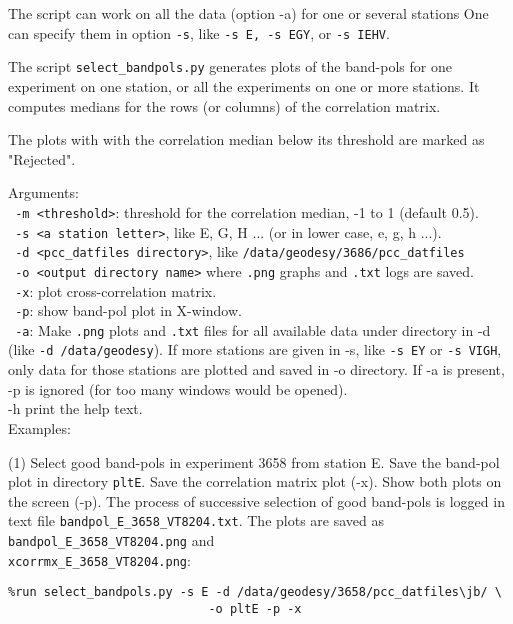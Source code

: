 \documentclass[preprint]{aastex}
\begin{document}
The script can work on all the data (option -a) for one or several stations One can specify them in option \texttt{-s}, like \texttt{-s E, -s EGY}, or \texttt{-s IEHV}.

The script \texttt{select\_bandpols.py} generates plots of the band-pols for one experiment on one station, or all the experiments on one or more stations. It computes medians for the rows (or columns) of the correlation matrix.

The plots with with the correlation median below its threshold are marked as "Rejected". 

Arguments: \\
\texttt{  -m <threshold>}:    threshold for the correlation median, -1 to 1 (default 0.5). \\
\texttt{ -s <a station letter>}, like E, G, H ... (or in lower case, e, g, h ...). \\
\texttt{  -d <pcc\_datfiles directory>}, like \texttt{/data/geodesy/3686/pcc\_datfiles} \\
\texttt{  -o <output directory name>} where \texttt{.png} graphs and \texttt{.txt} logs are saved. \\
\texttt{  -x}: plot cross-correlation matrix. \\
\texttt{  -p}: show band-pol plot in X-window. \\
\texttt{  -a}: Make \texttt{.png} plots and \texttt{.txt} files for all available data under directory in -d (like \texttt{-d /data/geodesy}). If more stations are given in -s, like \texttt{-s EY} or \texttt{-s VIGH}, only data for those stations are plotted and saved in -o directory. If -a is present, -p is ignored (for too many windows would be opened). \\
  -h print the help text. \\

Examples:

(1) Select good band-pols in experiment 3658 from station E. Save the band-pol
plot in directory \texttt{pltE}. Save the correlation matrix plot (-x). Show both plots
on the screen (-p). 
The process of successive selection of good band-pols is logged in text file 
\verb$bandpol_E_3658_VT8204.txt$. 
The plots are saved as \verb$bandpol_E_3658_VT8204.png$ and \\
\verb$xcorrmx_E_3658_VT8204.png$: 

\verb$%run select_bandpols.py -s E -d /data/geodesy/3658/pcc_datfiles\jb/ \$ \\
\verb$                            -o pltE -p -x$
\end{document}
